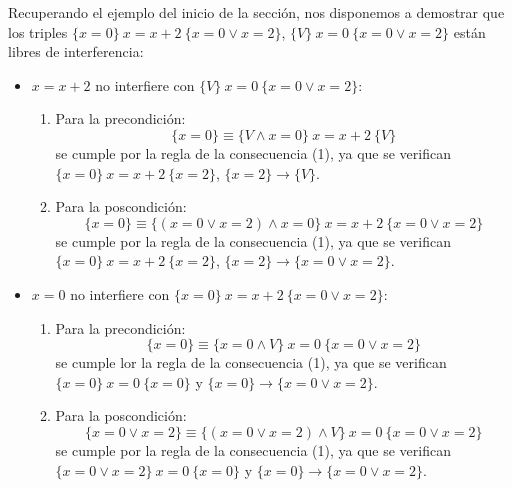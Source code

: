 \begin{ejemplo}
    Recuperando el ejemplo del inicio de la sección, nos disponemos a demostrar que los triples $\{x=0\}\ x=x+2\ \{x=0 \lor x=2\}$, $\{V\}\ x=0\ \{x=0 \lor x=2\}$ están libres de interferencia:
    \begin{itemize}
        \item $x=x+2$ no interfiere con $\{V\}\ x=0\ \{x=0 \lor x=2\}$:
            \begin{enumerate}
                \item Para la precondición:
                    \begin{equation*}
                        \{x=0\} \equiv \{V \land x = 0\}\ x=x+2\ \{V\}
                    \end{equation*}
                    se cumple por la regla de la consecuencia (1), ya que se verifican $\{x=0\}\ x=x+2\ \{x=2\}$, $\{x=2\} \rightarrow \{V\}$.
                \item Para la poscondición:
                    \begin{equation*}
                        \{x=0\} \equiv \{(x=0 \lor x=2)\land x=0\}\ x=x+2\ \{x=0 \lor x=2\}
                    \end{equation*}
                    se cumple por la regla de la consecuencia (1), ya que se verifican $\{x=0\}\ x=x+2\ \{x=2\}$, $\{x=2\} \rightarrow\{x=0 \lor x=2\}$.
            \end{enumerate}
        \item $x=0$ no interfiere con $\{x=0\}\ x=x+2\ \{x=0 \lor x=2\}$:
            \begin{enumerate}
                \item Para la precondición:
                    \begin{equation*}
                        \{x=0\} \equiv \{x=0 \land V\}\ x=0\ \{x=0 \lor x=2\}
                    \end{equation*}
                    se cumple lor la regla de la consecuencia (1), ya que se verifican $\{x=0\}\ x=0\ \{x=0\}$ y $\{x=0\}\rightarrow \{x=0 \lor x=2\}$.
                \item Para la poscondición:
                    \begin{equation*}
                        \{x=0 \lor x = 2\} \equiv \{(x=0 \lor x=2)\land V\}\ x=0\ \{x=0 \lor x=2\}
                    \end{equation*}
                    se cumple por la regla de la consecuencia (1), ya que se verifican $\{x=0 \lor x=2\}\ x=0\ \{x=0\}$ y $\{x=0\}\rightarrow \{x=0 \lor x=2\}$.
            \end{enumerate}
    \end{itemize}
\end{ejemplo}

